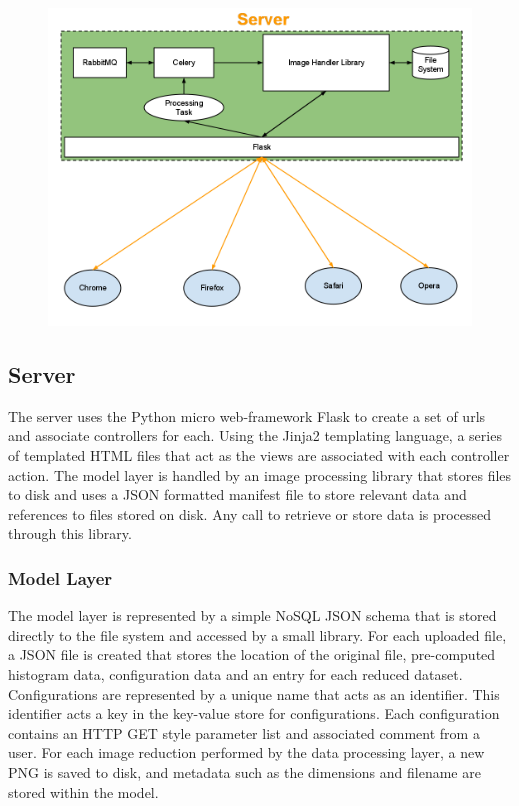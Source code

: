 \documentclass[annual]{acmsiggraph}
\begin{document}
\begin{figure}[htb]
\includegraphics[scale=0.475]{architecture.png}
\label{Medipa System Architecture}
\end{figure}

\subsection{Server}
	The server uses the Python micro web-framework Flask to create a set of urls and associate controllers for each.  Using the Jinja2 templating language, a series of templated HTML files that act as the views are associated with each controller action.  The model layer is handled by an image processing library that stores files to disk and uses a JSON formatted manifest file to store relevant data and references to files stored on disk.  Any call to retrieve or store data is processed through this library.

\subsubsection{Model Layer}
	The model layer is represented by a simple NoSQL JSON schema that is stored directly to the file system and accessed by a small library.  For each uploaded file, a JSON file is created that stores the location of the original file, pre-computed histogram data, configuration data and an entry for each reduced dataset.  Configurations are represented by a unique name that acts as an identifier.  This identifier acts a key in the key-value store for configurations.  Each configuration contains an HTTP GET style parameter list and associated comment from a user.  For each image reduction performed by the data processing layer, a new PNG is saved to disk, and metadata such as the dimensions and filename are stored within the model.
\end{document}
